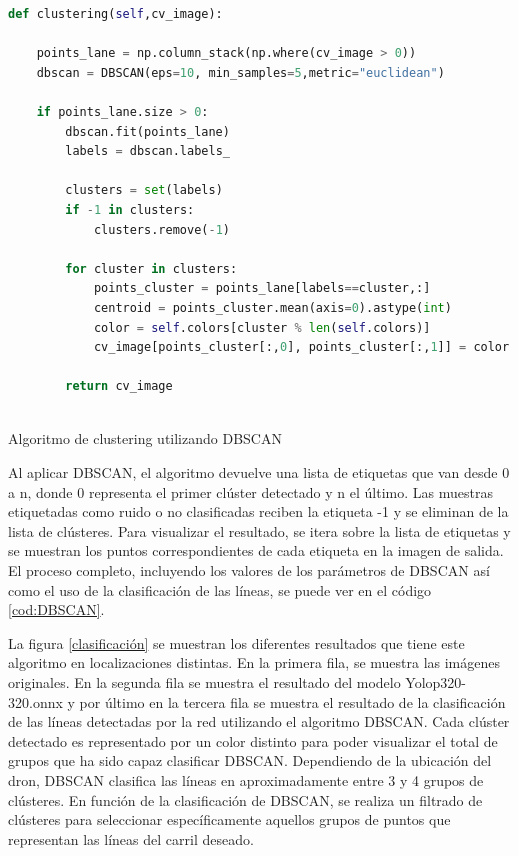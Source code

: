 \begin{code}[h]
  \begin{footnotesize}
  \begin{lstlisting}[language=Python]
    def clustering(self,cv_image):
    
    points_lane = np.column_stack(np.where(cv_image > 0))
    dbscan = DBSCAN(eps=10, min_samples=5,metric="euclidean")

    if points_lane.size > 0:
        dbscan.fit(points_lane)
        labels = dbscan.labels_

        clusters = set(labels)
        if -1 in clusters:
            clusters.remove(-1)
    
        for cluster in clusters:
            points_cluster = points_lane[labels==cluster,:]
            centroid = points_cluster.mean(axis=0).astype(int)
            color = self.colors[cluster % len(self.colors)]
            cv_image[points_cluster[:,0], points_cluster[:,1]] = color

        return cv_image
  
  \end{lstlisting}
  \caption[Algoritmo de clustering utilizando DBSCAN]{Algoritmo de clustering utilizando DBSCAN}
  \label{cod:DBSCAN}
  \end{footnotesize}
  \end{code}  


Al aplicar DBSCAN, el algoritmo devuelve una lista de etiquetas que van desde 0 a n, 
donde 0 representa el primer clúster detectado y n el último. Las muestras etiquetadas como ruido o no clasificadas reciben la etiqueta -1 y se eliminan de la lista de clústeres. Para visualizar 
el resultado, se itera sobre la lista de etiquetas y se muestran los puntos correspondientes de cada etiqueta en la imagen de salida. El proceso completo, incluyendo los valores 
de los parámetros de DBSCAN así como el uso de la clasificación de las líneas, se puede ver en el código \ref{cod:DBSCAN}. \newline

La figura \ref{clasificación} se muestran los diferentes resultados que tiene este algoritmo en localizaciones distintas. En la primera fila, se muestra las imágenes originales. En la segunda 
fila se muestra el resultado del modelo Yolop320-320.onnx y por último en la tercera fila se muestra el resultado de la clasificación de las líneas detectadas por la red 
utilizando el algoritmo DBSCAN. Cada clúster detectado es representado por un color distinto para poder visualizar el total de grupos que ha sido capaz clasificar DBSCAN.
Dependiendo de la ubicación del dron, DBSCAN clasifica las líneas en aproximadamente entre 3 y 4 grupos de clústeres. En función de la clasificación de DBSCAN, se realiza 
un filtrado de clústeres para seleccionar específicamente aquellos grupos de puntos que representan las líneas del carril deseado.


